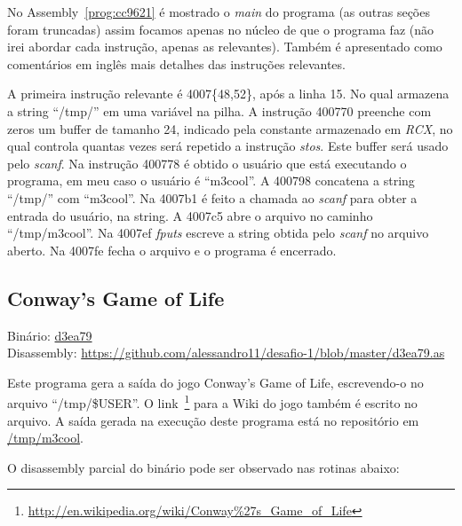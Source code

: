 

No Assembly~\ref{prog:cc9621} é mostrado o \emph{main} do programa (as
outras seções foram truncadas) assim focamos apenas no núcleo de que o
programa faz (não irei abordar cada instrução, apenas as
relevantes). Também é apresentado como comentários em inglês mais
detalhes das instruções relevantes.

A primeira instrução relevante é 4007\{48,52\}, após a linha 15. No qual
armazena a string ``/tmp/'' em uma variável na pilha. A instrução
400770 preenche com zeros um buffer de tamanho 24, indicado pela
constante armazenado em \emph{RCX}, no qual controla quantas vezes será
repetido a instrução \emph{stos}. Este buffer será usado pelo
\emph{scanf}. Na instrução 400778 é obtido o usuário que está
executando o programa, em meu caso o usuário é ``m3cool''. A 400798
concatena a string ``/tmp/'' com ``m3cool''. Na 4007b1 é feito a
chamada ao \emph{scanf} para obter a entrada do usuário, na string. A
4007c5 abre o arquivo no caminho ``/tmp/m3cool''. Na
4007ef \emph{fputs} escreve a string obtida pelo \emph{scanf} no
arquivo aberto. Na 4007fe fecha o arquivo e o programa é encerrado.


\subsection{Conway's Game of Life}
\noindent Binário: \href{https://s3.amazonaws.com/chaordic-desafio-cloud/d3ea79}{d3ea79}\\
Disassembly: \href{https://github.com/alessandro11/desafio-1/blob/master/d3ea79.as}{https://github.com/alessandro11/desafio-1/blob/master/d3ea79.as}\\
\par
Este programa gera a saída do jogo Conway's Game of Life,
escrevendo-o no arquivo ``/tmp/\$USER''. O
link~\footnote{\href{http://en.wikipedia.org/wiki/Conway\%27s\_Game\_of\_Life}{http://en.wikipedia.org/wiki/Conway\%27s\_Game\_of\_Life}}
para a Wiki do jogo também é escrito no arquivo. A saída gerada na
execução deste programa está no repositório em
\href{https://github.com/alessandro11/desafio-1/blob/master/m3cool}{/tmp/m3cool}.

O disassembly parcial do binário pode ser observado nas rotinas abaixo:



